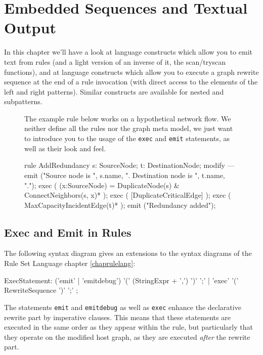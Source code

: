 \chapter{Embedded Sequences and Textual Output}
\label{cha:imperativeandstate}
\label{sct:imperative}

In this chapter we'll have a look at language constructs which allow you to emit text from rules (and a light version of an inverse of it, the scan/tryscan functions), and at language constructs which allow you to execute a graph rewrite sequence at the end of a rule invocation (with direct access to the elements of the left and right patterns).
Similar constructs are available for nested and subpatterns.

\begin{figure}[htbp]
\begin{example}
	The example rule below works on a hypothetical network flow.
	We neither define all the rules nor the graph meta model,
	we just want to introduce you to the usage of the \texttt{exec} and \texttt{emit} statements, as well as their look and feel.
	\begin{grgen}
rule AddRedundancy
{
  s: SourceNode;
  t: DestinationNode;
  modify {
  ---
    emit ("Source node is ", s.name, ". Destination node is ", t.name, ".");
    exec ( (x:SourceNode) = DuplicateNode(s) & ConnectNeighbors(s, x)* );
    exec ( [DuplicateCriticalEdge] );
    exec ( MaxCapacityIncidentEdge(t)* );
    emit ("Redundancy added");
  }
}
	\end{grgen}
\end{example}
\end{figure}

\section{Exec and Emit in Rules}\label{sct:execemitrules}

The following syntax diagram gives an extensions to the syntax diagrams of the Rule Set Language chapter \ref{chaprulelang}:
\begin{rail}
  ExecStatement: ('emit' | 'emitdebug') '(' (StringExpr + ',') ')' ';' | 'exec' '(' RewriteSequence ')' ';'
	;
\end{rail}

The statements \texttt{emit} and \texttt{emitdebug} as well as \texttt{exec} enhance the declarative rewrite part by imperative clauses.
This means that these statements are executed in the same order as they appear within the rule,
but particularly that they operate on the modified host graph, as they are executed \emph{after} the rewrite part.

